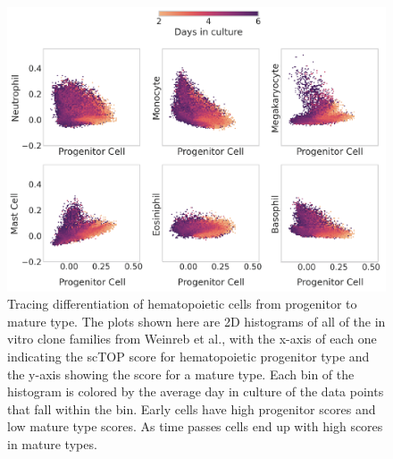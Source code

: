 \documentclass[aps,superscriptaddress, notitlepage,longbibliography]{revtex4-1}
\begin{document}
\begin{figure}
	\centering
		\includegraphics[scale=0.75]{figs/hem progenitor hists.png}
	\caption{Tracing differentiation of hematopoietic cells from progenitor to mature type. The plots shown here are 2D histograms of all of the in vitro clone families from Weinreb et al., with the x-axis of each one indicating the scTOP score for hematopoietic progenitor type and the y-axis showing the score for a mature type. Each bin of the histogram is colored by the average day in culture of the data points that fall within the bin. Early cells have high progenitor scores and low mature type scores. As time passes cells end up with high scores in mature types.}
	\label{hem progenitor}
\end{figure}
\end{document}
